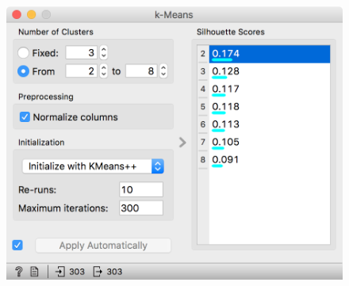 \begin{figure}[h]
    \centering
    \includegraphics[width=\linewidth]{kmeans-silhouette-scores.png}
    \caption{$\;$} %
\end{figure}
